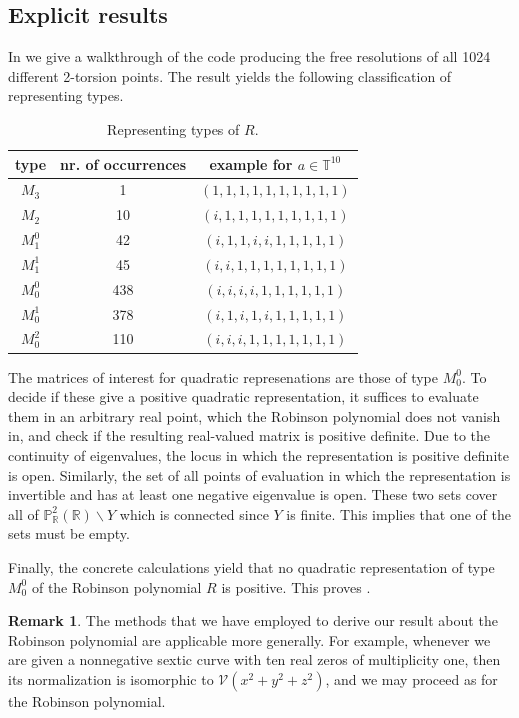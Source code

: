 \documentclass[a4paper,10pt]{amsart}
\theoremstyle{definition}
\newtheorem{rem}[Def]{Remark}
\theoremstyle{plain}
\newcommand{\cV}{{\mathcal V}}
\newcommand{\R}{{\mathbb R}}
\newcommand{\pp}{\mathbb{P}}
\begin{document}
\subsection*{Explicit results}

In  we give a walkthrough of the code producing the free resolutions of all 1024 different 2-torsion points. The result yields the following classification of representing types.

\begin{table}[h!]
   \centering
   \begin{tabular}{c|c|c}
       type &  nr. of occurrences & example for $a\in\mathbb{T}^{10}$ \\ \hline
       $M_3$ & 1 & $(1,1,1,1,1,1,1,1,1,1)$ \\
       $M_2$ & 10 & $(i,1,1,1,1,1,1,1,1,1)$ \\
       $M_1^0$ & 42 & $(i,1,1,i,i,1,1,1,1,1)$ \\
       $M_1^1$ & 45 & $(i,i,1,1,1,1,1,1,1,1)$ \\
       $M_0^0$ & 438 & $(i,i,i,i,1,1,1,1,1,1)$ \\
       $M_0^1$ & 378 & $(i,1,i,1,i,1,1,1,1,1)$ \\
       $M_0^2$ & 110 & $(i,i,i,1,1,1,1,1,1,1)$
    \end{tabular}
    \caption{Representing types of $R$.}
    \label{tab:classesRob}
\end{table}

The matrices of interest for quadratic represenations are those of type $M_0^0$. To decide if these give a positive quadratic representation, it suffices to evaluate them in an arbitrary real point, which the Robinson polynomial does not vanish in, and check if the resulting real-valued matrix is positive definite. Due to the continuity of eigenvalues, the locus in which the representation is positive definite is open. Similarly, the set of all points of evaluation in which the representation is invertible and has at least one negative eigenvalue is open. These two sets cover all of $\pp^2_\R(\R) \backslash Y$ which is connected since $Y$ is finite. This implies that one of the sets must be empty.

Finally, the concrete calculations yield that no quadratic representation of type $M_0^0$ of the Robinson polynomial $R$ is positive. This proves .

\begin{rem}
 The methods that we have employed to derive our result about the Robinson polynomial are applicable more generally. For example, whenever we are given a nonnegative sextic curve with ten real zeros of multiplicity one, then its normalization is isomorphic to $\cV(x^2 + y^2 + z^2)$, and we may proceed as for the Robinson polynomial. 
\end{rem}
\end{document}
